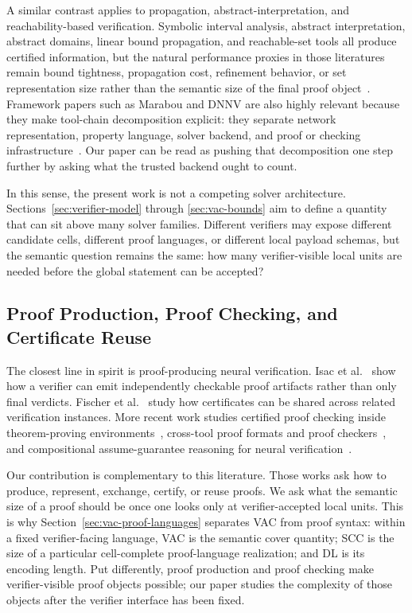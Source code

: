 A similar contrast applies to propagation, abstract-interpretation, and reachability-based verification. Symbolic interval analysis, abstract interpretation, abstract domains, linear bound propagation, and reachable-set tools all produce certified information, but the natural performance proxies in those literatures remain bound tightness, propagation cost, refinement behavior, or set representation size rather than the semantic size of the final proof object~\cite{Wang2018ReluVal,Gehr2018AI2,Singh2019AbstractDomain,Zhang2018CROWN,Lopez2023NNV2}. Framework papers such as Marabou and DNNV are also highly relevant because they make tool-chain decomposition explicit: they separate network representation, property language, solver backend, and proof or checking infrastructure~\cite{Katz2019Marabou,Shriver2021DNNV}. Our paper can be read as pushing that decomposition one step further by asking what the trusted backend ought to count.

In this sense, the present work is not a competing solver architecture. Sections~\ref{sec:verifier-model} through \ref{sec:vac-bounds} aim to define a quantity that can sit above many solver families. Different verifiers may expose different candidate cells, different proof languages, or different local payload schemas, but the semantic question remains the same: how many verifier-visible local units are needed before the global statement can be accepted?

\subsection{Proof Production, Proof Checking, and Certificate Reuse}

The closest line in spirit is proof-producing neural verification. Isac et al.~\cite{Isac2022ProofProduction} show how a verifier can emit independently checkable proof artifacts rather than only final verdicts. Fischer et al.~\cite{Fischer2022SharedCertificates} study how certificates can be shared across related verification instances. More recent work studies certified proof checking inside theorem-proving environments~\cite{Desmartin2025ImandraChecker}, cross-tool proof formats and proof checkers~\cite{Duong2025APTP}, and compositional assume-guarantee reasoning for neural verification~\cite{Duong2025CoVeNN}.

Our contribution is complementary to this literature. Those works ask how to produce, represent, exchange, certify, or reuse proofs. We ask what the semantic size of a proof should be once one looks only at verifier-accepted local units. This is why Section~\ref{sec:vac-proof-languages} separates VAC from proof syntax: within a fixed verifier-facing language, VAC is the semantic cover quantity; SCC is the size of a particular cell-complete proof-language realization; and DL is its encoding length. Put differently, proof production and proof checking make verifier-visible proof objects possible; our paper studies the complexity of those objects after the verifier interface has been fixed.

